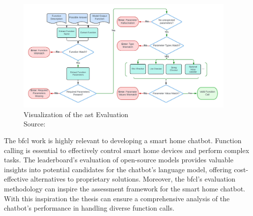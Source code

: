 \begin{figure}[h]
  \centering
  \captionsetup{justification=centering}
  \includegraphics[width=0.96\textwidth]{graphics/bfcl-ast.jpeg}
  \caption{Visualization of the \gls{ast} Evaluation\\Source: \citet{berkeley-function-calling-leaderboard}}
  \label{fig:ast}
\end{figure}

The \gls{bfcl} work is highly relevant to developing a smart home chatbot. 
Function calling is essential to effectively control smart home devices and perform complex tasks. 
The leaderboard's evaluation of open-source models provides valuable insights into potential candidates for the chatbot's language model, offering cost-effective alternatives to proprietary solutions. 
Moreover, the \gls{bfcl}'s evaluation methodology can inspire the assessment framework for the smart home chatbot. 
With this inspiration the thesis can ensure a comprehensive analysis of the chatbot's performance in handling diverse function calls.